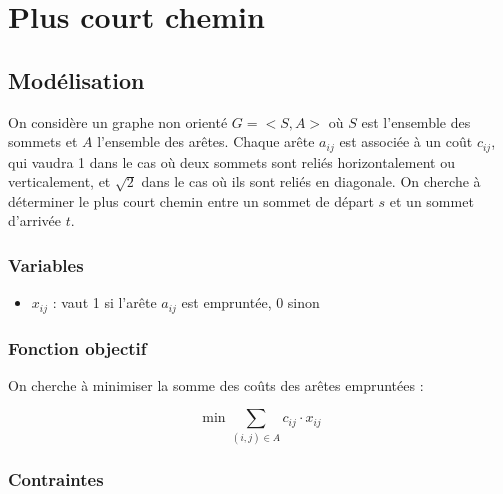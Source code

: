 \chapter{Plus court chemin}
\label{ch:shortest_path}

\section{Modélisation}
\label{sec:shortest_path_model}

On considère un graphe non orienté $G=<S,A>$ où $S$ est l'ensemble des sommets et $A$ l'ensemble des arêtes. Chaque arête $a_{ij}$ est associée à un coût $c_{ij}$, qui vaudra 1 dans le cas où deux sommets sont reliés horizontalement ou verticalement, et $\sqrt{2}$ dans le cas où ils sont reliés en diagonale. On cherche à déterminer le plus court chemin entre un sommet de départ $s$ et un sommet d'arrivée $t$.

\subsection{Variables}

\begin{itemize}
    \item $x_{ij}$ : vaut 1 si l'arête $a_{ij}$ est empruntée, 0 sinon
\end{itemize}

\subsection{Fonction objectif}

On cherche à minimiser la somme des coûts des arêtes empruntées :

\begin{equation}
    \min \sum_{(i,j) \in A} c_{ij} \cdot x_{ij}
\end{equation}

\subsection{Contraintes}


